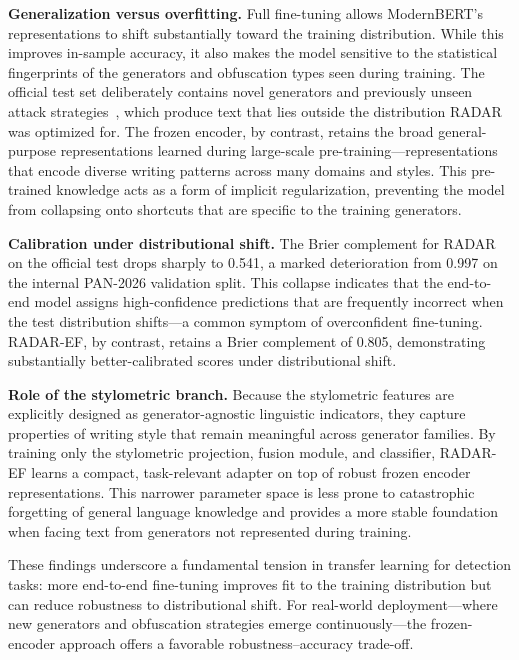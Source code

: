 \documentclass[]{ceurart}
\begin{document}
\textbf{Generalization versus overfitting.} Full fine-tuning allows ModernBERT's representations to shift substantially toward the training distribution. While this improves in-sample accuracy, it also makes the model sensitive to the statistical fingerprints of the generators and obfuscation types seen during training. The official test set deliberately contains novel generators and previously unseen attack strategies~\cite{bevendorff:2026c}, which produce text that lies outside the distribution RADAR was optimized for. The frozen encoder, by contrast, retains the broad general-purpose representations learned during large-scale pre-training---representations that encode diverse writing patterns across many domains and styles. This pre-trained knowledge acts as a form of implicit regularization, preventing the model from collapsing onto shortcuts that are specific to the training generators.

\textbf{Calibration under distributional shift.} The Brier complement for RADAR on the official test drops sharply to 0.541, a marked deterioration from 0.997 on the internal PAN-2026 validation split. This collapse indicates that the end-to-end model assigns high-confidence predictions that are frequently incorrect when the test distribution shifts---a common symptom of overconfident fine-tuning. RADAR-EF, by contrast, retains a Brier complement of 0.805, demonstrating substantially better-calibrated scores under distributional shift.

\textbf{Role of the stylometric branch.} Because the stylometric features are explicitly designed as generator-agnostic linguistic indicators, they capture properties of writing style that remain meaningful across generator families. By training only the stylometric projection, fusion module, and classifier, RADAR-EF learns a compact, task-relevant adapter on top of robust frozen encoder representations. This narrower parameter space is less prone to catastrophic forgetting of general language knowledge and provides a more stable foundation when facing text from generators not represented during training.

These findings underscore a fundamental tension in transfer learning for detection tasks: more end-to-end fine-tuning improves fit to the training distribution but can reduce robustness to distributional shift. For real-world deployment---where new generators and obfuscation strategies emerge continuously---the frozen-encoder approach offers a favorable robustness--accuracy trade-off.
\end{document}
